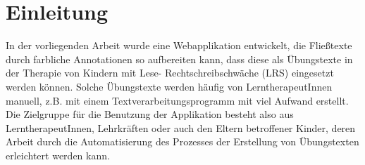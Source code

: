 
\chapter{Einleitung}

In der vorliegenden Arbeit wurde eine Webapplikation entwickelt, die Fließtexte durch farbliche Annotationen so aufbereiten kann, dass diese als Übungstexte in der Therapie von Kindern mit Lese- Rechtschreibschwäche (LRS) eingesetzt werden können. Solche Übungstexte werden häufig von LerntherapeutInnen manuell, z.B. mit einem Textverarbeitungsprogramm mit viel Aufwand erstellt. Die Zielgruppe für die Benutzung der Applikation besteht also aus LerntherapeutInnen, Lehrkräften oder auch den Eltern betroffener Kinder, deren Arbeit durch die Automatisierung des Prozesses der Erstellung von Übungstexten erleichtert werden kann.\\

